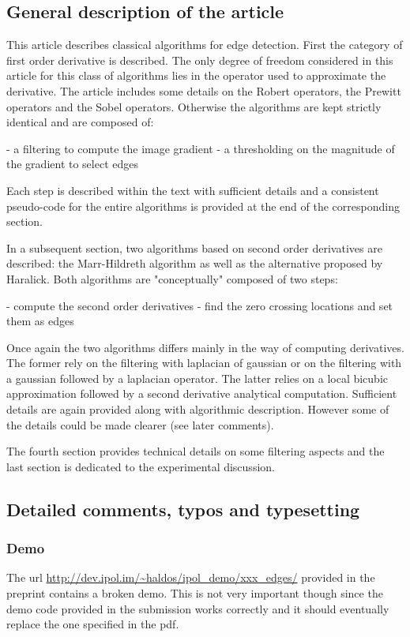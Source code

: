 \documentclass[a4paper,10pt]{report}
\begin{document}
\subsection{General description of the article}
This article describes classical algorithms for edge detection. First the
category of first order derivative is described. The only degree of freedom
considered in this article for this class of algorithms lies in the operator
used to approximate the derivative. The article includes some details on the
Robert operators, the Prewitt operators and the Sobel operators. Otherwise the
algorithms are kept strictly identical and are composed of:

- a filtering to compute the image gradient
- a thresholding on the magnitude of the gradient to select edges

Each step is described within the text with sufficient details and a consistent
pseudo-code for the entire algorithms is provided at the end of the
corresponding section.

In a subsequent section, two algorithms based on second order derivatives are
described: the Marr-Hildreth algorithm as well as the alternative proposed by
Haralick. Both algorithms are "conceptually" composed of two steps:

- compute the second order derivatives
- find the zero crossing locations and set them as edges

Once again the two algorithms differs mainly in the way of computing
derivatives. The former rely on the filtering with laplacian of gaussian or on
the filtering with a gaussian followed by a laplacian operator. The latter
relies on a local bicubic approximation followed by a second derivative
analytical computation. Sufficient details are again provided along with
algorithmic description. However some of the details could be made clearer (see
later comments).

The fourth section provides technical details on some filtering aspects and the
last section is dedicated to the experimental discussion.


\subsection{Detailed comments, typos and typesetting}
\subsubsection{Demo}
The url \url{http://dev.ipol.im/~haldos/ipol_demo/xxx_edges/} provided in the preprint
contains a broken demo. This is not very important though since the demo code
provided in the submission works correctly and it should eventually replace the
one specified in the pdf.
\end{document}
